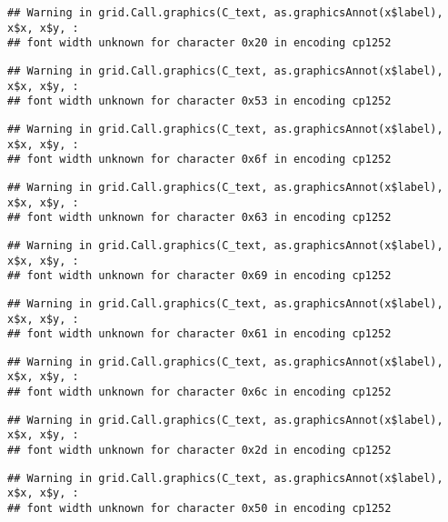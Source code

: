 \documentclass[
]{article}
\begin{document}
\begin{verbatim}
## Warning in grid.Call.graphics(C_text, as.graphicsAnnot(x$label), x$x, x$y, :
## font width unknown for character 0x20 in encoding cp1252
\end{verbatim}

\begin{verbatim}
## Warning in grid.Call.graphics(C_text, as.graphicsAnnot(x$label), x$x, x$y, :
## font width unknown for character 0x53 in encoding cp1252
\end{verbatim}

\begin{verbatim}
## Warning in grid.Call.graphics(C_text, as.graphicsAnnot(x$label), x$x, x$y, :
## font width unknown for character 0x6f in encoding cp1252
\end{verbatim}

\begin{verbatim}
## Warning in grid.Call.graphics(C_text, as.graphicsAnnot(x$label), x$x, x$y, :
## font width unknown for character 0x63 in encoding cp1252
\end{verbatim}

\begin{verbatim}
## Warning in grid.Call.graphics(C_text, as.graphicsAnnot(x$label), x$x, x$y, :
## font width unknown for character 0x69 in encoding cp1252
\end{verbatim}

\begin{verbatim}
## Warning in grid.Call.graphics(C_text, as.graphicsAnnot(x$label), x$x, x$y, :
## font width unknown for character 0x61 in encoding cp1252
\end{verbatim}

\begin{verbatim}
## Warning in grid.Call.graphics(C_text, as.graphicsAnnot(x$label), x$x, x$y, :
## font width unknown for character 0x6c in encoding cp1252
\end{verbatim}

\begin{verbatim}
## Warning in grid.Call.graphics(C_text, as.graphicsAnnot(x$label), x$x, x$y, :
## font width unknown for character 0x2d in encoding cp1252
\end{verbatim}

\begin{verbatim}
## Warning in grid.Call.graphics(C_text, as.graphicsAnnot(x$label), x$x, x$y, :
## font width unknown for character 0x50 in encoding cp1252
\end{verbatim}
\end{document}
